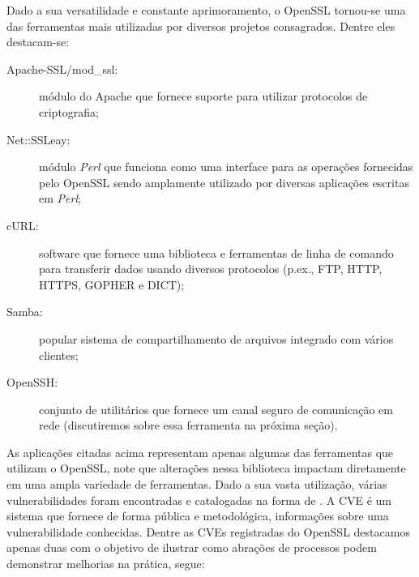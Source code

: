 Dado a sua versatilidade e constante aprimoramento, o OpenSSL tornou-se uma das
ferramentas mais utilizadas por diversos projetos consagrados. Dentre eles
destacam-se:

\begin{description}
  \item [Apache-SSL/mod\_ssl:] módulo do Apache que fornece suporte para utilizar protocolos de criptografia;
  \item [Net::SSLeay:] módulo \emph{Perl} que funciona como uma interface para as operações fornecidas pelo OpenSSL sendo amplamente utilizado por diversas aplicações escritas em \emph{Perl};
  \item [cURL:] software que fornece uma biblioteca e ferramentas de linha de comando para transferir dados usando diversos protocolos (p.ex., FTP, HTTP, HTTPS, GOPHER e DICT); 
  \item [Samba:] popular sistema de compartilhamento de arquivos integrado com vários clientes;
  \item [OpenSSH:] conjunto de utilitários que fornece um canal seguro de comunicação em rede (discutiremos sobre essa ferramenta na próxima seção).
\end{description}

As aplicações citadas acima representam apenas algumas das ferramentas que
utilizam o OpenSSL, note que alterações nessa biblioteca impactam diretamente
em uma ampla variedade de ferramentas. Dado a sua vasta utilização, várias
vulnerabilidades foram encontradas e catalogadas na forma de . A CVE é
um sistema que fornece de forma pública e metodológica, informações sobre uma
vulnerabilidade conhecidas. Dentre as CVEs registradas do OpenSSL destacamos
apenas duas com o objetivo de ilustrar como abrações de processos podem
demonstrar melhorias na prática, segue:

